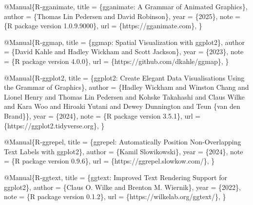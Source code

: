 \documentclass[
]{article}
\newenvironment{Shaded}{\begin{snugshade}}{\end{snugshade}}
\newcommand{\DataTypeTok}[1]{\textcolor[rgb]{0.13,0.29,0.53}{#1}}
\newcommand{\NormalTok}[1]{#1}
\newcommand{\OtherTok}[1]{\textcolor[rgb]{0.56,0.35,0.01}{#1}}
\newcommand{\VariableTok}[1]{\textcolor[rgb]{0.00,0.00,0.00}{#1}}
\begin{document}
\begin{Shaded}
\begin{Highlighting}[]
\VariableTok{@Manual}\NormalTok{\{}\OtherTok{R}\NormalTok{{-}}\OtherTok{gganimate}\NormalTok{,}
  \DataTypeTok{title}\NormalTok{ = \{gganimate: A Grammar of Animated Graphics\},}
  \DataTypeTok{author}\NormalTok{ = \{Thomas Lin Pedersen and David Robinson\},}
  \DataTypeTok{year}\NormalTok{ = \{2025\},}
  \DataTypeTok{note}\NormalTok{ = \{R package version 1.0.9.9000\},}
  \DataTypeTok{url}\NormalTok{ = \{https://gganimate.com\},}
\NormalTok{\}}

\VariableTok{@Manual}\NormalTok{\{}\OtherTok{R}\NormalTok{{-}}\OtherTok{ggmap}\NormalTok{,}
  \DataTypeTok{title}\NormalTok{ = \{ggmap: Spatial Visualization with ggplot2\},}
  \DataTypeTok{author}\NormalTok{ = \{David Kahle and Hadley Wickham and Scott Jackson\},}
  \DataTypeTok{year}\NormalTok{ = \{2023\},}
  \DataTypeTok{note}\NormalTok{ = \{R package version 4.0.0\},}
  \DataTypeTok{url}\NormalTok{ = \{https://github.com/dkahle/ggmap\},}
\NormalTok{\}}

\VariableTok{@Manual}\NormalTok{\{}\OtherTok{R}\NormalTok{{-}}\OtherTok{ggplot2}\NormalTok{,}
  \DataTypeTok{title}\NormalTok{ = \{ggplot2: Create Elegant Data Visualisations Using the Grammar of Graphics\},}
  \DataTypeTok{author}\NormalTok{ = \{Hadley Wickham and Winston Chang and Lionel Henry and Thomas Lin Pedersen and Kohske Takahashi and Claus Wilke and Kara Woo and Hiroaki Yutani and Dewey Dunnington and Teun \{van den Brand\}\},}
  \DataTypeTok{year}\NormalTok{ = \{2024\},}
  \DataTypeTok{note}\NormalTok{ = \{R package version 3.5.1\},}
  \DataTypeTok{url}\NormalTok{ = \{https://ggplot2.tidyverse.org\},}
\NormalTok{\}}

\VariableTok{@Manual}\NormalTok{\{}\OtherTok{R}\NormalTok{{-}}\OtherTok{ggrepel}\NormalTok{,}
  \DataTypeTok{title}\NormalTok{ = \{ggrepel: Automatically Position Non{-}Overlapping Text Labels with}
\NormalTok{ggplot2\},}
  \DataTypeTok{author}\NormalTok{ = \{Kamil Slowikowski\},}
  \DataTypeTok{year}\NormalTok{ = \{2024\},}
  \DataTypeTok{note}\NormalTok{ = \{R package version 0.9.6\},}
  \DataTypeTok{url}\NormalTok{ = \{https://ggrepel.slowkow.com/\},}
\NormalTok{\}}

\VariableTok{@Manual}\NormalTok{\{}\OtherTok{R}\NormalTok{{-}}\OtherTok{ggtext}\NormalTok{,}
  \DataTypeTok{title}\NormalTok{ = \{ggtext: Improved Text Rendering Support for ggplot2\},}
  \DataTypeTok{author}\NormalTok{ = \{Claus O. Wilke and Brenton M. Wiernik\},}
  \DataTypeTok{year}\NormalTok{ = \{2022\},}
  \DataTypeTok{note}\NormalTok{ = \{R package version 0.1.2\},}
  \DataTypeTok{url}\NormalTok{ = \{https://wilkelab.org/ggtext/\},}
\NormalTok{\}}


\end{Highlighting}
\end{Shaded}
\end{document}
